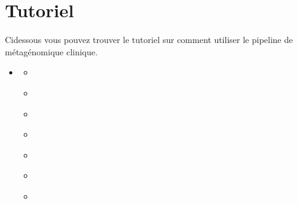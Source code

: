 \documentclass[letterpaper,10pt,french]{sphinxmanual}
\begin{document}
\section{Tutoriel}
\label{\detokenize{tutorial:tutoriel}}\label{\detokenize{tutorial::doc}}
Ci\sphinxhyphen{}dessous vous pouvez trouver le tutoriel sur comment utiliser le pipeline de métagénomique clinique.

\begin{sphinxShadowBox}
\begin{itemize}
\item {} 
\label{\detokenize{tutorial:id37}}{\hyperref[\detokenize{tutorial:tutoriel}]{}}
\begin{itemize}
\item {} 
\label{\detokenize{tutorial:id38}}{\hyperref[\detokenize{tutorial:le-pre-traitement-des-reads}]{}}

\item {} 
\label{\detokenize{tutorial:id39}}{\hyperref[\detokenize{tutorial:le-telechargement-de-la-base-de-donnees-fda-argos}]{}}

\item {} 
\label{\detokenize{tutorial:id40}}{\hyperref[\detokenize{tutorial:le-telechargement-de-la-base-de-donnees-mycocosm}]{}}

\item {} 
\label{\detokenize{tutorial:id41}}{\hyperref[\detokenize{tutorial:le-telechargement-de-la-base-de-donnees-fungidb}]{}}

\item {} 
\label{\detokenize{tutorial:id42}}{\hyperref[\detokenize{tutorial:le-telechargement-de-la-base-de-donnees-refseq}]{}}

\item {} 
\label{\detokenize{tutorial:id43}}{\hyperref[\detokenize{tutorial:l-indexation-d-une-base-de-donnees-avec-kraken-2}]{}}

\item {} 
\label{\detokenize{tutorial:id44}}{\hyperref[\detokenize{tutorial:classification-des-reads-avec-kraken-2}]{}}


\end{itemize}
\end{itemize}
\end{sphinxShadowBox}
\end{document}

